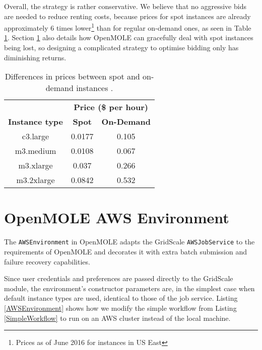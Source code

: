 Overall, the strategy is rather conservative. We believe that no aggressive bids are needed to reduce renting costs, because prices for spot instances are already approximately 6 times lower\footnote{Prices as of June 2016 for instances in US East} than for regular on-demand ones, as seen in Table \ref{SpotPricing}. Section \ref{OpenMOLEAWSSection} also details how OpenMOLE can gracefully deal with spot instances being lost, so designing a complicated strategy to optimise bidding only has diminishing returns.

\begin{table}[h]
\centering
\begin{tabular}{ccc}
\multicolumn{1}{l}{} & \multicolumn{2}{c}{\textbf{Price (\$ per hour)}} \\ \cline{2-3} 
\multicolumn{1}{c|}{\textbf{Instance type}} & \multicolumn{1}{c|}{\textbf{Spot}} & \multicolumn{1}{c|}{\textbf{On-Demand}} \\ \hline
\multicolumn{1}{|c|}{c3.large} & \multicolumn{1}{c|}{0.0177} & \multicolumn{1}{c|}{0.105} \\ \hline
\multicolumn{1}{|c|}{m3.medium} & \multicolumn{1}{c|}{0.0108} & \multicolumn{1}{c|}{0.067} \\ \hline
\multicolumn{1}{|c|}{m3.xlarge} & \multicolumn{1}{c|}{0.037} & \multicolumn{1}{c|}{0.266} \\ \hline
\multicolumn{1}{|c|}{m3.2xlarge} & \multicolumn{1}{c|}{0.0842} & \multicolumn{1}{c|}{0.532} \\ \hline
\end{tabular}
\caption{Differences in prices between spot and on-demand instances \cite{AWSPricing}.}
\label{SpotPricing}
\end{table}

\section{OpenMOLE AWS Environment} \label{OpenMOLEAWSSection}

The \verb|AWSEnvironment| in OpenMOLE adapts the GridScale \verb|AWSJobService| to the requirements of OpenMOLE and decorates it with extra batch submission and failure recovery capabilities. 

Since user credentials and preferences are passed directly to the GridScale module, the environment's constructor parameters are, in the simplest case when default instance types are used, identical to those of the job service. Listing \ref{AWSEnvironment} shows how we modify the simple workflow from Listing \ref{SimpleWorkflow} to run on an AWS cluster instead of the local machine.

